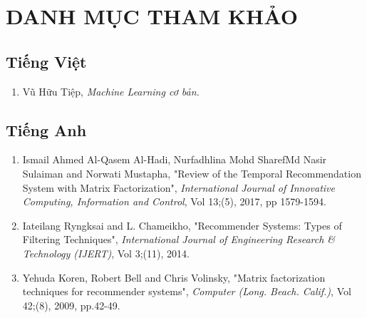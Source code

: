 \chapter*{DANH MỤC THAM KHẢO}
\section*{Tiếng Việt}
\begin{enumerate}
    \item Vũ Hữu Tiệp, \textit{Machine Learning cơ bản.}
\end{enumerate}
\section*{Tiếng Anh}
\begin{enumerate}
    \item Ismail Ahmed Al-Qasem Al-Hadi, Nurfadhlina Mohd SharefMd Nasir Sulaiman and Norwati Mustapha, "Review of the Temporal Recommendation System with Matrix Factorization", \textit{International Journal of Innovative Computing, Information and Control}, Vol 13;(5), 2017, pp 1579-1594.
    \item Iateilang Ryngksai and L. Chameikho, "Recommender Systems: Types of Filtering Techniques", \textit{International Journal of Engineering Research & Technology (IJERT)}, Vol 3;(11), 2014.
    \item Yehuda Koren, Robert Bell and Chris Volinsky, "Matrix factorization techniques for recommender systems", \textit{Computer (Long. Beach. Calif.)}, Vol 42;(8), 2009, pp.42-49.
\end{enumerate}